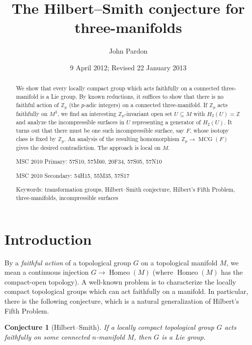 \documentclass[12pt]{article}
\theoremstyle{plain}
\newtheorem{conjecture}[theorem]{Conjecture}
\theoremstyle{definition}
\theoremstyle{remark}
\numberwithin{equation}{section}
\begin{document}
\title{The Hilbert--Smith conjecture for three-manifolds}

\author{John Pardon}

\date{9 April 2012; Revised 22 January 2013}

\maketitle

\begin{abstract}
We show that every locally compact group which acts faithfully on a connected three-manifold is a Lie group.  By known reductions, it suffices to show that there is no faithful action of $\mathbb Z_p$ (the $p$-adic integers) on a connected three-manifold.  If $\mathbb Z_p$ acts faithfully on $M^3$, we find an interesting $\mathbb Z_p$-invariant open set $U\subseteq M$ with $H_2(U)=\mathbb Z$ and analyze the incompressible surfaces in $U$ representing a generator of $H_2(U)$.  It turns out that there must be one such incompressible surface, say $F$, whose isotopy class is fixed by $\mathbb Z_p$.  An analysis of the resulting homomorphism $\mathbb Z_p\to\operatorname{MCG}(F)$ gives the desired contradiction.  The approach is local on $M$.

MSC 2010 Primary: 57S10, 57M60, 20F34, 57S05, 57N10

MSC 2010 Secondary: 54H15, 55M35, 57S17

Keywords: transformation groups, Hilbert--Smith conjecture, Hilbert's Fifth Problem, three-manifolds, incompressible surfaces
\end{abstract}

\section{Introduction}

By a \emph{faithful action} of a topological group $G$ on a topological manifold $M$, we mean a continuous injection $G\to\operatorname{Homeo}(M)$ (where $\operatorname{Homeo}(M)$ has the compact-open topology).  A well-known problem is to characterize the locally compact topological groups which can act faithfully on a manifold.  In particular, there is the following conjecture, which is a natural generalization of Hilbert's Fifth Problem.

\begin{conjecture}[Hilbert--Smith]\label{hilbert}
If a locally compact topological group $G$ acts faithfully on some connected $n$-manifold $M$, then $G$ is a Lie group.
\end{conjecture}
\end{document}
